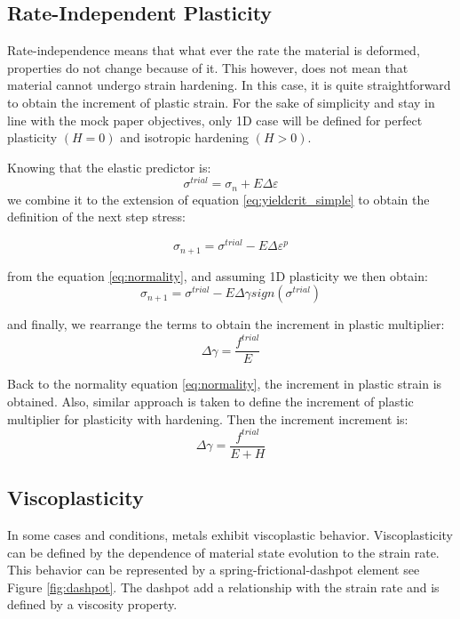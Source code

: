 \documentclass[final,5p,times,twocolumn]{elsarticle}
\begin{document}
\subsection{Rate-Independent Plasticity}
\label{sub:Rate-Independent Plasticity}
Rate-independence means that what ever the rate the material is deformed, properties do not change because of it. This however, does not mean that material cannot undergo strain hardening. In this case, it is quite straightforward to obtain the increment of plastic strain. For the sake of simplicity and stay in line with the mock paper objectives, only 1D case will be defined for perfect plasticity $(H=0)$ and isotropic hardening $(H>0)$.

Knowing that the elastic predictor is:
\begin{equation}
  \sigma^{trial}=\sigma_{n}+E\Delta \varepsilon \label{eq:elasticpred}  
\end{equation}
we combine it to the extension of equation \ref{eq:yieldcrit_simple} to obtain the definition of the next step stress:

\begin{equation}
  \sigma_{n+1} = \sigma^{trial}-E\Delta \varepsilon^{p}
\end{equation}

from the equation \ref{eq:normality}, and assuming 1D plasticity we then obtain:
\begin{equation}
  \sigma_{n+1} = \sigma^{trial}-E\Delta \gamma sign(\sigma^{trial})
\end{equation}

and finally, we rearrange the terms to obtain the increment in plastic multiplier:
\begin{equation}
  \Delta \gamma = \dfrac{f^{trial}}{E} \label{eq:gammainc}
\end{equation}

Back to the normality equation \ref{eq:normality}, the increment in plastic strain is obtained. Also, similar approach is taken to define the increment of plastic multiplier for plasticity with hardening. Then the increment increment is:
\begin{equation}
  \Delta \gamma = \dfrac{f^{trial}}{E + H} \label{eq:gammainchard}
\end{equation}


\subsection{Viscoplasticity}
\label{sub:Viscoplasticity}
In some cases and conditions, metals exhibit viscoplastic behavior. Viscoplasticity can be defined by the dependence of material state evolution to the strain rate. This behavior can be represented by a spring-frictional-dashpot element see Figure \ref{fig:dashpot}. The dashpot add a relationship with the strain rate and is defined by a viscosity property.
\end{document}
